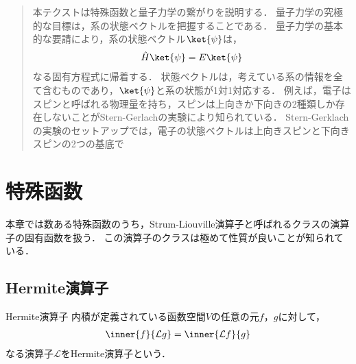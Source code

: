 \documentclass{report}
\begin{document}
  \begin{abstract}
    本テクストは特殊函数と量子力学の繋がりを説明する．
    量子力学の究極的な目標は，系の状態ベクトルを把握することである．
    量子力学の基本的な要請により，系の状態ベクトル$\ket{\psi}$は，
    \begin{align}
      \hat{H}\ket{\psi} = E\ket{\psi}
    \end{align}
    なる固有方程式に帰着する．
    状態ベクトルは，考えている系の情報を全て含むものであり，$\ket{\psi}$と系の状態が1対1対応する．
    例えば，電子はスピンと呼ばれる物理量を持ち，スピンは上向きか下向きの2種類しか存在しないことがStern-Gerlachの実験により知られている．
    Stern-Gerklachの実験のセットアップでは，電子の状態ベクトルは上向きスピンと下向きスピンの2つの基底で
  \end{abstract}
    \chapter{特殊函数}
    本章では数ある特殊函数のうち，Strum-Liouville演算子と呼ばれるクラスの演算子の固有函数を扱う．
    この演算子のクラスは極めて性質が良いことが知られている．
    \section{Hermite演算子}
      \begin{mydef}{Hermite演算子}{}
        内積が定義されている函数空間$V$の任意の元$f$，$g$に対して，
        \begin{align}
          \inner{f}{\mathcal{L}g} = \inner{\mathcal{L}f}{g}
        \end{align}
        なる演算子$\mathcal{L}$をHermite演算子という．
      \end{mydef}
\end{document}
